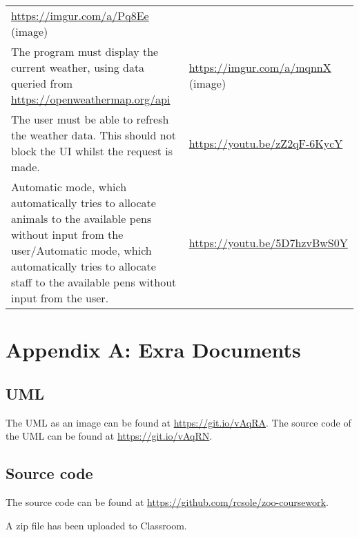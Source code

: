 \documentclass[english,a4paper,]{report}
\begin{document}
\begin{longtable}[]{@{}ll@{}}
\begin{minipage}[t]{0.47\columnwidth}
\url{https://imgur.com/a/Pq8Ee} (image)\strut
\end{minipage}\tabularnewline
\begin{minipage}[t]{0.47\columnwidth}\raggedright
The program must display the current weather, using data queried from
\url{https://openweathermap.org/api}\strut
\end{minipage} & \begin{minipage}[t]{0.47\columnwidth}\raggedright
\url{https://imgur.com/a/mqnnX} (image)\strut
\end{minipage}\tabularnewline
\begin{minipage}[t]{0.47\columnwidth}\raggedright
The user must be able to refresh the weather data. This should not block
the UI whilst the request is made.\strut
\end{minipage} & \begin{minipage}[t]{0.47\columnwidth}\raggedright
\url{https://youtu.be/zZ2qF-6KycY}\strut
\end{minipage}\tabularnewline
\begin{minipage}[t]{0.47\columnwidth}\raggedright
Automatic mode, which automatically tries to allocate animals to the
available pens without input from the user/Automatic mode, which
automatically tries to allocate staff to the available pens without
input from the user.\strut
\end{minipage} & \begin{minipage}[t]{0.47\columnwidth}\raggedright
\url{https://youtu.be/5D7hzvBwS0Y}\strut
\end{minipage}\tabularnewline
\bottomrule
\end{longtable}

\hypertarget{appendix-a-exra-documents}{%
\chapter{Appendix A: Exra Documents}\label{appendix-a-exra-documents}}

\hypertarget{uml}{%
\section{UML}\label{uml}}

The UML as an image can be found at \url{https://git.io/vAqRA}. The
source code of the UML can be found at \url{https://git.io/vAqRN}.

\hypertarget{source-code}{%
\section{Source code}\label{source-code}}

The source code can be found at
\url{https://github.com/rcsole/zoo-coursework}.

A zip file has been uploaded to Classroom.
\end{document}
